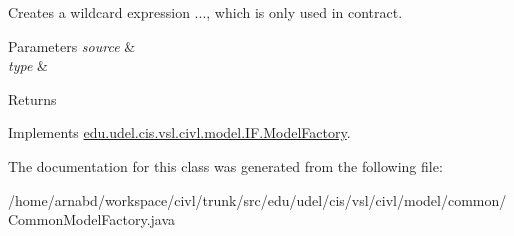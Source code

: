 Creates a wildcard expression {\ttfamily ...}, which is only used in contract. 


\begin{DoxyParams}{Parameters}
{\em source} & \\
\hline
{\em type} & \\
\hline
\end{DoxyParams}
\begin{DoxyReturn}{Returns}

\end{DoxyReturn}


Implements \hyperlink{interfaceedu_1_1udel_1_1cis_1_1vsl_1_1civl_1_1model_1_1IF_1_1ModelFactory_a2652e7aa21044b6de2912f38a1310cae}{edu.\+udel.\+cis.\+vsl.\+civl.\+model.\+I\+F.\+Model\+Factory}.



The documentation for this class was generated from the following file\+:\begin{DoxyCompactItemize}
\item 
/home/arnabd/workspace/civl/trunk/src/edu/udel/cis/vsl/civl/model/common/Common\+Model\+Factory.\+java\end{DoxyCompactItemize}
